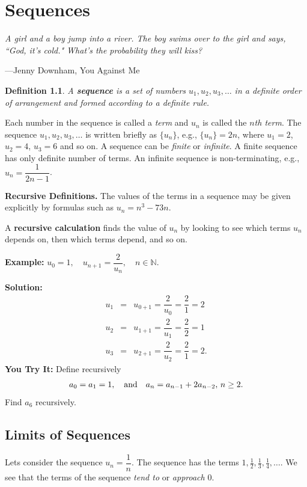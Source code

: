\documentclass[titlepage,a4paper,12pt]{report}
\newtheorem{definition}{Definition}[section]
\begin{document}
\chapter{Sequences}
\begin{center}
	\small{\parbox{18cm}{
		\begin{raggedright}
		{\small
		\textit{A girl and a boy jump into a river. The boy swims over to the girl and says, ``God, it's cold." What's the probability they will kiss?}
 }
 
				\vspace{.5cm}\hfill{---Jenny Downham, You Against Me }
		\end{raggedright}
	}
} 
\end{center}
\begin{definition}
A \textbf{sequence} is a set of numbers $u_1, u_2, u_3, \dots$ in a definite order of arrangement and formed according to a definite rule.
\end{definition}
\noindent Each number in the sequence is called a \textit{term} and $u_n$ is called the \textit{$n$th term}. The sequence $u_1,u_2,u_3, \dots$ is written briefly as  $\{u_n\}$, e.g., $\{u_n\}=2n$, where $u_1=2$, $u_2=4$, $u_3=6$ and so on. A sequence can be \textit{finite} or \textit{infinite}. A finite sequence has only definite number of terms. An infinite sequence is non-terminating, e.g., $u_n=\dfrac{1}{2n-1}$.

\noindent \textbf{Recursive Definitions.} The values of the terms in a sequence may be given explicitly by formulas such as $u_n=n^3-73n$. 

\noindent A \textbf{recursive calculation} finds the value of $u_n$ by looking to see which terms $u_n$ depends on, then which terms depend, and so on.

\noindent \textbf{Example:} $u_0=1, \quad u_{n+1}=\dfrac{2}{u_n}, \quad n\in \mathbb{N}$.

\noindent \textbf{Solution:} 
\begin{eqnarray*}
u_1 &=& u_{0+1} = \dfrac{2}{u_0}=\dfrac{2}{1}=2\\
u_2 &=& u_{1+1}= \dfrac{2}{u_1} =\dfrac{2}{2}=1\\
u_3 &=& u_{2+1} = \dfrac{2}{u_2} =\dfrac{2}{1}=2.
\end{eqnarray*} 
\textbf{You Try It:} Define recursively 
\begin{equation*}
a_0=a_1=1, \quad \hbox{and} \quad a_n=a_{n-1}+2a_{n-2}, \, n\geq 2.
\end{equation*}
Find $a_6$ recursively.
\section{Limits of Sequences}
Lets consider the sequence $u_n=\dfrac{1}{n}$. The sequence has the terms $1, \frac{1}{2}, \frac{1}{3}, \frac{1}{4}, \dots$. We see that the terms of the sequence \textit{tend to} or \textit{approach} $0$.
\end{document}
